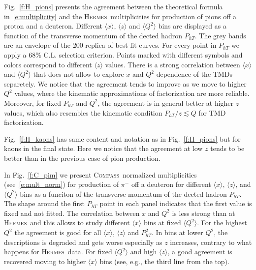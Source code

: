 \documentclass[aps,preprintnumbers,showpacs,nofootinbib,superscriptaddress,floatfix]{revtex4}
\newcommand{\AS}[1]{{\textcolor[rgb]{1,0,1}{#1}}}
\newcommand{\hermes}{\textsc{Hermes}}
\newcommand{\compass}{\textsc{Compass}}
\begin{document}

Fig.~\ref{f:H_pions} presents the agreement between the theoretical formula in~\eqref{e:multiplicity} and the \hermes\ multiplicities for production of pions off a proton and a deuteron. 
Different $\langle x \rangle$, $\langle z \rangle$ and $\langle Q^2 \rangle$ bins are displayed as a \AS{function} of the transverse momentum of the dected hadron $P_{hT}$.
The grey bands are an envelope of the $200$ replica of best-fit curves. For every point in $P_{hT}$ we apply a $68\%$ C.L. selection criterion. 
Points marked with different symbols and colors correspond to different $\langle z \rangle$ values. There is a strong correlation between $\langle x \rangle$ and $\langle Q^2 \rangle$ that does not allow to explore $x$ and $Q^2$ dependence of the TMDs separetely. 
We notice that the agreement tends to improve as we move to higher $Q^2$ values, where the kinematic approximations of factorization are more reliable. 
Moreover, for fixed $P_{hT}$ and $Q^2$, the agreement is in general better at higher $z$ values, which also resembles the kinematic condition $P_{hT}/z \lesssim Q$ for TMD factorization.

Fig.~\ref{f:H_kaons} has same content and notation as in Fig.~\ref{f:H_pions} but for kaons in the final state. Here we notice that the agreement at low $z$ tends to be better than in the previous case of pion production. 

In Fig.~\ref{f:C_pim} we present \compass\ normalized multiplicities (see~\eqref{e:mult_norm}) for production of $\pi^-$ off a deuteron for different $\langle x \rangle$, $\langle z \rangle$, and $\langle Q^2 \rangle$ bins as a funciton of the transverse momentum of the dected hadron $P_{hT}$. The \AS{shape} around the first $P_{hT}$ point in each panel indicates that the first value is fixed and not fitted. 
The correlation between $x$ and $Q^2$ is less strong than at \hermes\ and this allows to study different $\langle x \rangle$ bins at fixed $\langle Q^2 \rangle$.
For the highest $Q^2$ the agreement is good for all $\langle x \rangle$, $\langle z \rangle$ and $P_{hT}^2$. In bins at lower $Q^2$, the descriptions is degraded and gets worse especially as $z$ increases, contrary to \AS{what happens for} \hermes\ data. 
For fixed $\langle Q^2 \rangle$ and high $\langle z \rangle$, a good agreement is recovered moving to higher $\langle x \rangle$ bins \AS{(see, e.g., the third line from the top)}.
\end{document}
